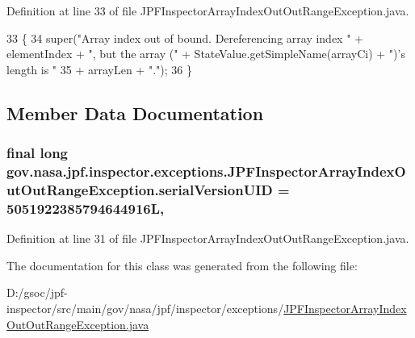 Definition at line 33 of file J\+P\+F\+Inspector\+Array\+Index\+Out\+Out\+Range\+Exception.\+java.


\begin{DoxyCode}
33                                                                                                         \{
34     super(\textcolor{stringliteral}{"Array index out of bound. Dereferencing array index "} + elementIndex + \textcolor{stringliteral}{", but the array ("} + 
      StateValue.getSimpleName(arrayCi) + \textcolor{stringliteral}{")'s length is "}
35         + arrayLen + \textcolor{stringliteral}{"."});
36   \}
\end{DoxyCode}


\subsection{Member Data Documentation}
\subsubsection[{\texorpdfstring{serial\+Version\+U\+ID}{serialVersionUID}}]{\setlength{\rightskip}{0pt plus 5cm}final long gov.\+nasa.\+jpf.\+inspector.\+exceptions.\+J\+P\+F\+Inspector\+Array\+Index\+Out\+Out\+Range\+Exception.\+serial\+Version\+U\+ID = 5051922385794644916L\hspace{0.3cm}{\ttfamily [static]}, {\ttfamily [private]}}\hypertarget{classgov_1_1nasa_1_1jpf_1_1inspector_1_1exceptions_1_1_j_p_f_inspector_array_index_out_out_range_exception_a87258c3e45651bee3eab6ddc508f962c}{}\label{classgov_1_1nasa_1_1jpf_1_1inspector_1_1exceptions_1_1_j_p_f_inspector_array_index_out_out_range_exception_a87258c3e45651bee3eab6ddc508f962c}


Definition at line 31 of file J\+P\+F\+Inspector\+Array\+Index\+Out\+Out\+Range\+Exception.\+java.



The documentation for this class was generated from the following file\+:\begin{DoxyCompactItemize}
\item 
D\+:/gsoc/jpf-\/inspector/src/main/gov/nasa/jpf/inspector/exceptions/\hyperlink{_j_p_f_inspector_array_index_out_out_range_exception_8java}{J\+P\+F\+Inspector\+Array\+Index\+Out\+Out\+Range\+Exception.\+java}\end{DoxyCompactItemize}
